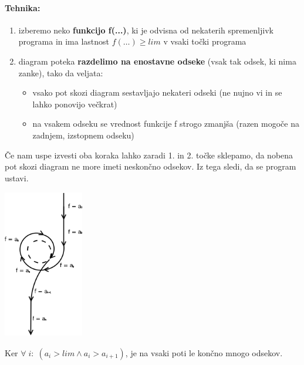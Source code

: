 \documentclass[a4paper,10pt]{article}
\begin{document}
\paragraph{Tehnika:}
\begin{enumerate}
\item izberemo neko \textbf{funkcijo f(...)}, ki je odvisna od nekaterih spremenljivk programa in ima lastnost $f(\ldots) \geq lim$ v vsaki to\v cki programa
\item diagram poteka \textbf{razdelimo na enostavne odseke} (vsak tak odsek, ki nima zanke), tako da veljata:
	\begin{itemize}
	\item vsako pot skozi diagram sestavljajo nekateri odseki (ne nujno vi in se lahko ponovijo ve\v ckrat)
	\item na vsakem odseku se vrednost funkcije f strogo zmanj\v sa (razen mogo\v ce na zadnjem, izstopnem odseku)
	\end{itemize}
\end{enumerate}
\v Ce nam uspe izvesti oba koraka lahko zaradi 1. in 2. to\v cke sklepamo, da nobena pot skozi diagram ne more imeti neskon\v cno odsekov. Iz tega sledi, da se program ustavi.
	\begin{center}
	\includegraphics[width=3.5cm,height=6.5cm]{Slike/Ustavljivost.png}
	\end{center}
Ker $\forall \;i:\;(a_i > lim \wedge a_i>a_{i+1})$, je na vsaki poti le kon\v cno mnogo odsekov.
\end{document}
